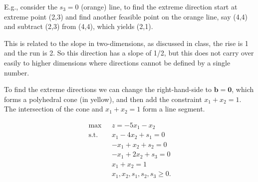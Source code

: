 

  
\medskip E.g., consider the $s_3=0$ (orange) line, to find the extreme direction start at extreme point (2,3) and find another feasible point on the orange line, say (4,4) and subtract (2,3) from (4,4), which yields (2,1). 

\medskip This is related to the slope in two-dimensions, as discussed in class, the rise is 1 and the run is 2. So this direction has a slope of 1/2, but this does not carry over easily to higher dimensions where directions cannot be defined by a single number. 

\medskip To find the extreme directions we can change the right-hand-side to $\mathbf{b} = \mathbf{0}$, which forms a polyhedral cone (in yellow), and then add the constraint $x_1 + x_2 = 1$. The intersection of the cone and  $x_1 + x_2 = 1$ form a line segment.

\begin{minipage}[t][][b]{.4\linewidth} \vspace{0mm}
\begin{align*}
\mbox{max~~} & z = -5x_1 - x_2  \\
\mbox{s.t.~~} & x_1 - 4x_2 +s_1 = 0  \\
& -x_1 + x_2 + s_2 = 0 \\
& -x_1 + 2x_2 +s_3 = 0 \\
& x_1 + x_2 = 1 \\
& x_1, x_2, s_1, s_2, s_3 \ge 0.
\end{align*}
\end{minipage}%
\begin{minipage}[t][][b]{.6\linewidth}
\begin{center}  \end{center} 
\end{minipage}



